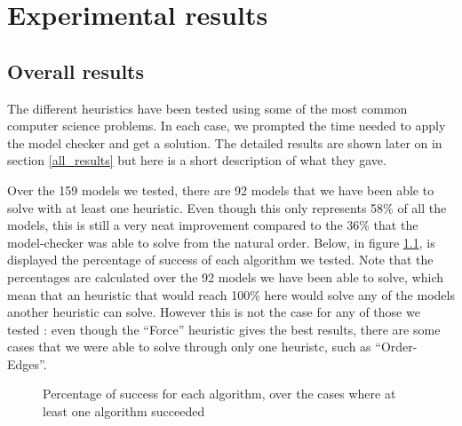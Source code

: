 \documentclass[12pt]{report}
\begin{document}
\chapter{Experimental results}

\section{Overall results}

The different heuristics have been tested using some of the most common computer science problems. In each case, we prompted the time needed to apply the model checker and get a solution. The detailed results are shown later on in section \ref{all_results} but here is a short description of what they gave.

Over the 159 models we tested, there are 92 models that we have been able to solve with at least one heuristic. Even though this only represents 58\% of all the models, this is still a very neat improvement compared to the 36\% that the model-checker was able to solve from the natural order.
Below, in figure \ref{success_percentage}, is displayed the percentage of success of each algorithm we tested. Note that the percentages are calculated over the 92 models we have been able to solve, which mean that an heuristic that would reach 100\% here would solve any of the models another heuristic can solve. However this is not the case for any of those we tested : even though the \enquote{Force} heuristic gives the best results, there are some cases that we were able to solve through only one heuristc, such as \enquote{Order-Edges}.

\begin{figure}[!h]
  \begin{center}
\end{center}
\label{success_percentage}
\caption {Percentage of success for each algorithm, over the cases where at least one algorithm succeeded}
\end{figure}
\end{document}
